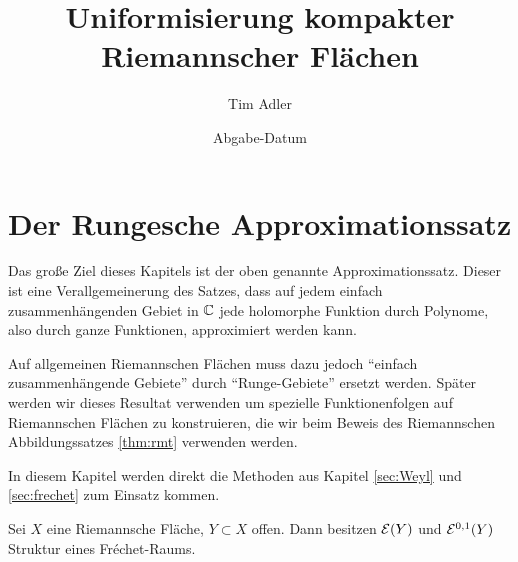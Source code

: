 
\titlehead{Universität Heidelberg \\
  Fakultät für Mathematik \& Informatik\\
  Im Neuenheimer Feld 288\\
  69120 Heidelberg}
\subject{Bachelor-Arbeit}
\title{Uniformisierung kompakter Riemannscher Flächen}
\author{Tim Adler}
\date{Abgabe-Datum}
\publishers{Betreut durch AR Dr. Hendrik Kasten}





\section{Der Rungesche Approximationssatz}
\label{sec:Runge}

Das große Ziel dieses Kapitels ist der oben genannte
Approximationssatz. Dieser ist eine Verallgemeinerung des Satzes, dass
auf jedem einfach zusammenhängenden Gebiet in $\mathbb{C}$ jede holomorphe
Funktion durch Polynome, also durch ganze Funktionen, approximiert
werden kann.

Auf allgemeinen Riemannschen Flächen muss dazu jedoch "`einfach
zusammenhängende Gebiete"' durch "`Runge-Gebiete"' ersetzt
werden. Später werden wir dieses Resultat verwenden um spezielle
Funktionenfolgen auf Riemannschen Flächen zu konstruieren, die wir
beim Beweis des Riemannschen Abbildungssatzes \ref{thm:rmt} verwenden
werden.

In diesem Kapitel werden direkt die Methoden aus Kapitel
\ref{sec:Weyl} und \ref{sec:frechet} zum Einsatz kommen.

\begin{prop}
  \label{prop:diff-frechet}
  Sei $X$ eine Riemannsche Fläche, $Y \subset X$ offen. 
  Dann besitzen $\mathcal{E}(Y)$ und $\mathcal{E}^{0,1}(Y)$ Struktur eines Fr\'echet-Raums.
\end{prop}

